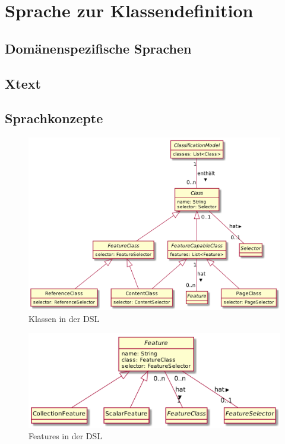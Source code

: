 \section{Sprache zur Klassendefinition}
    \subsection{Domänenspezifische Sprachen}
    \subsection{Xtext}

    \subsection{Sprachkonzepte}
        \begin{figure}[htb]
            \centering
            \includegraphics[width=\textwidth]{../resources/dsl/classes.png}
            \caption{Klassen in der DSL}
            \label{image:dslClasses}
        \end{figure}

        \begin{figure}[htb]
            \centering
            \includegraphics[width=\textwidth]{../resources/dsl/features.png}
            \caption{Features in der DSL}
            \label{image:dslFeatures}
        \end{figure}


